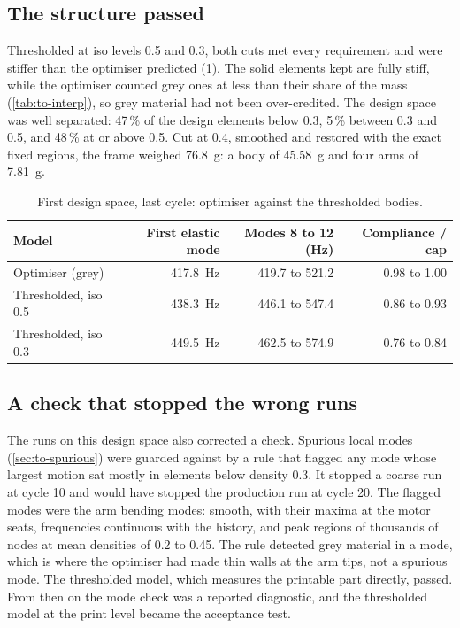 \subsection{The structure passed}

Thresholded at iso levels 0.5 and 0.3, both cuts met every requirement and were stiffer than the optimiser predicted (\cref{tab:iter-1}). The solid elements kept are fully stiff, while the optimiser counted grey ones at less than their share of the mass (\cref{tab:to-interp}), so grey material had not been over-credited. The design space was well separated: 47\,\% of the design elements below 0.3, 5\,\% between 0.3 and 0.5, and 48\,\% at or above 0.5. Cut at 0.4, smoothed and restored with the exact fixed regions, the frame weighed \SI{76.8}{g}: a body of \SI{45.58}{g} and four arms of \SI{7.81}{g}.

\begin{table}[htbp]
\centering\small
\caption{First design space, last cycle: optimiser against the thresholded bodies.}\label{tab:iter-1}
\begin{tabular}{@{}lrrr@{}}
\toprule
Model & First elastic mode & Modes 8 to 12 (Hz) & Compliance / cap\\
\midrule
Optimiser (grey) & \SI{417.8}{Hz} & 419.7 to 521.2 & 0.98 to 1.00\\
Thresholded, iso 0.5 & \SI{438.3}{Hz} & 446.1 to 547.4 & 0.86 to 0.93\\
Thresholded, iso 0.3 & \SI{449.5}{Hz} & 462.5 to 574.9 & 0.76 to 0.84\\
\bottomrule
\end{tabular}
\end{table}

\subsection{A check that stopped the wrong runs}

The runs on this design space also corrected a check. Spurious local modes (\cref{sec:to-spurious}) were guarded against by a rule that flagged any mode whose largest motion sat mostly in elements below density 0.3. It stopped a coarse run at cycle 10 and would have stopped the production run at cycle 20. The flagged modes were the arm bending modes: smooth, with their maxima at the motor seats, frequencies continuous with the history, and peak regions of thousands of nodes at mean densities of 0.2 to 0.45. The rule detected grey material in a mode, which is where the optimiser had made thin walls at the arm tips, not a spurious mode. The thresholded model, which measures the printable part directly, passed. From then on the mode check was a reported diagnostic, and the thresholded model at the print level became the acceptance test.

